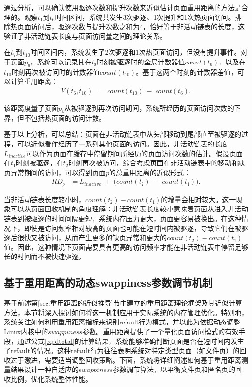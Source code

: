 通过分析，可以确认使用驱逐次数和提升次数来近似估计页面重用距离的方法是合理的。观察$t_1$到$t_6$时间区间，系统共发生3次驱逐、1次提升和1次热页面访问。排除热页面访问后，驱逐次数与提升次数之和为4，恰好等于非活动链表的长度，这验证了非活动链表长度与页面访问量之间的理论关系。

在$t_7$到$t_{10}$时间区间内，系统发生了2次驱逐和1次热页面访问，但没有提升事件。对于页面$p_6$，系统可以记录其在$t_6$时刻被驱逐时的全局计数器值$count(t_6)$，以及在$t_{10}$时刻再次被访问时的计数器值$count(t_{10})$。基于这两个时刻的计数器差值，可以计算重用距离：
\begin{align}
  \label{eq:refault_distance}
  V(t_6, t_{10})
  &= 
  count(t_{10})
  \;-\;
  count(t_6).
\end{align}

该距离度量了页面$p_6$从被驱逐到再次访问期间，系统所经历的页面访问次数的下界，但不包括热页面的访问计数。

基于以上分析，可以总结：页面在非活动链表中从头部移动到尾部直至被驱逐的过程，可以近似看作经历了一系列其他页面的访问。因此，非活动链表的长度$L_{inactive}$可以作为页面在缓存中停留期间所经历的页面访问次数的估计。假设页面在$t_1$时刻被驱逐，在$t_2$时刻再次被访问，综合考虑页面在非活动链表中的移动和缺页异常期间的访问，可以得到页面$p$的总重用距离的近似形式：
\begin{align}
  \label{eq:dtotal}
  RD_p
  &= 
  L_{inactive}
  \;+\;
  \bigl(count(t_2) \;-\; count(t_1)\bigr).
\end{align}

当非活动链表长度较小时，$count(t_2) - count(t_1)$的增量会相对较大。这一现象可以从页面回收机制的角度理解：非活动链表长度较小意味着页面从进入非活动链表到被驱逐的时间间隔更短，系统内存压力更大，页面更容易被换出。在这种情况下，即使是访问频率相对较高的页面也可能在短时间内被驱逐，导致它们在被驱逐后很快又被访问，从而产生更多的缺页异常和更大的$count(t_2) - count(t_1)$值。因此，这种情况下页面需要具有更高的访问频率才能在非活动链表中停留足够长的时间而不被快速驱逐。


\subsection{基于重用距离的动态swappiness参数调节机制}

基于前述第\ref{sec:重用距离的近似推导}节中建立的重用距离理论框架及其近似计算方法，本节将深入探讨如何将这一机制应用于实际系统的内存管理优化。特别地，系统关注如何利用重用距离指标来识别refault行为模式，并以此为依据动态调整Linux内核中的\(swappiness\)参数。重用距离提供了一个量化页面访问模式的有效手段，通过公式\ref{eq:dtotal}的计算结果，系统能够准确判断页面是否在短时间内发生了refault的情况。这种refault行为往往表明系统对特定类型页面（如文件页）的回收过于激进，需要适当调整回收策略。下面，系统将详细阐述如何基于重用距离测量结果设计一种自适应的\(swappiness\)参数调节算法，以平衡文件页和匿名页的回收比例，优化系统整体性能。


